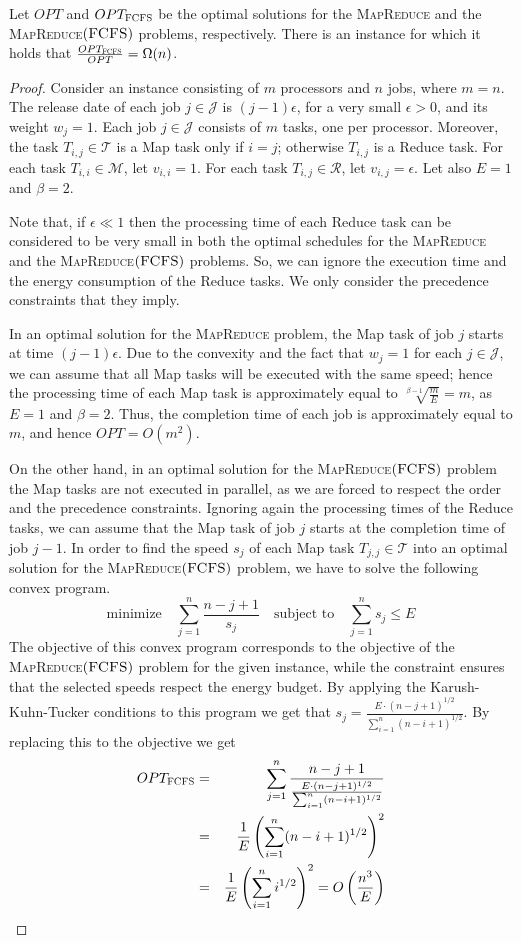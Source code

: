 \documentclass{llncs}
\newcommand{\mr}{\textsc{MapReduce}\xspace}
\newcommand{\fcfs}{\textsc{FCFS}\xspace}
\newcommand{\mrf}{\textsc{MapReduce$(\fcfs)$}\xspace}
\begin{document}
\begin{proposition}\label{prop:fcfs}
Let $OPT$ and $OPT_{\fcfs}$ be the optimal solutions for the \mr and the \mrf problems, respectively.
There is an instance for which it holds that $\frac{OPT_{\fcfs}}{OPT}=\Omega(n)$.
\end{proposition}
\begin{proof}
Consider an instance consisting of $m$ processors and $n$ jobs, where $m=n$.
The release date of each job $j \in \mathcal{J}$ is $(j-1)\epsilon$, for a very small $\epsilon>0$, and its weight $w_j=1$.
Each job $j \in \mathcal{J}$ consists of $m$ tasks, one per processor.
Moreover, the task $T_{i,j} \in \mathcal{T}$ is a Map task only if $i=j$; otherwise $T_{i,j}$ is a Reduce task.
For each task $T_{i,i} \in \mathcal{M}$, let $v_{i,i}=1$.
For each task $T_{i,j} \in \mathcal{R}$, let $v_{i,j}=\epsilon$.
Let also $E=1$ and $\beta=2$.

Note that, if $\epsilon \ll 1$ then the processing time of each Reduce task can be considered to be very small
in both the optimal schedules for the \mr and the \mrf problems.
So, we can ignore the execution time and the energy consumption of the Reduce tasks.
We only consider the precedence constraints that they imply.

In an optimal solution for the \mr problem, the Map task of job $j$ starts at time $(j-1)\epsilon$.
Due to the convexity and the fact that $w_j=1$ for each $j \in \mathcal{J}$,
we can assume that all Map tasks will be executed with the same speed;
hence the processing time of each Map task is approximately equal to $\sqrt[\beta-1]{\frac{m}{E}}=m$,
as $E=1$ and $\beta=2$.
Thus, the completion time of each job is approximately equal to $m$, and hence $OPT=O(m^2)$.

On the other hand, in an optimal solution for the \mrf problem the Map tasks are not executed in parallel,
as we are forced to respect the order and the precedence constraints.
Ignoring again the processing times of the Reduce tasks, we can assume that the Map task of job $j$ starts at the completion time of job $j-1$.
In order to find the speed $s_j$ of each Map task $T_{j,j} \in \mathcal{T}$
into an optimal solution for the \mrf problem, we have to solve the following convex program.
\begin{equation*}
\text{minimize ~ } \sum_{j=1}^n \frac{n-j+1}{s_j} \text{ ~ subject to ~ } \sum_{j=1}^n s_j \leq E
\end{equation*}
The objective of this convex program corresponds to the objective of the \mrf problem for the given instance,
while the constraint ensures that the selected speeds respect the energy budget.
By applying the Karush-Kuhn-Tucker conditions to this program
we get that $s_j=\frac{E\cdot(n-j+1)^{1/2}}{\sum_{i=1}^n (n-i+1)^{1/2}}$.
By replacing this to the objective we get
\begin{eqnarray*}
OPT_{\fcfs} & = & \sum_{j=1}^n \frac{n-j+1}{\frac{E \cdot (n-j+1)^{1/2}}{\sum_{i=1}^n (n-i+1)^{1/2}}}\\
 & = & \frac{1}{E}\left(\sum_{i=1}^n (n-i+1)^{1/2}\right)^2\\
 & = & \frac{1}{E}\left(\sum_{i=1}^n i^{1/2}\right)^2
 = O\left(\frac{n^3}{E}\right)
\end{eqnarray*}


\end{proof}
\end{document}
